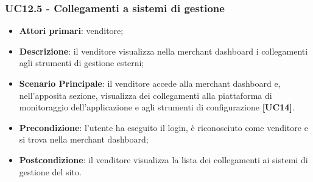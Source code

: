 \subsubsection{UC12.5 - Collegamenti a sistemi di gestione}
\begin{itemize}
\item \textbf{Attori primari}: venditore;
\item \textbf{Descrizione}: il venditore visualizza nella merchant dashboard i collegamenti agli strumenti di gestione esterni;
\item \textbf{Scenario Principale}: il venditore accede alla merchant dashboard e, nell'apposita sezione, visualizza dei collegamenti alla piattaforma di monitoraggio dell'applicazione e agli strumenti di configurazione \textbf{[UC14]}.
\item \textbf{Precondizione}: l'utente ha eseguito il login, è riconosciuto come venditore e si trova nella merchant dashboard;
\item \textbf{Postcondizione}: il venditore visualizza la lista dei collegamenti ai sistemi di gestione del sito.
\end{itemize}


